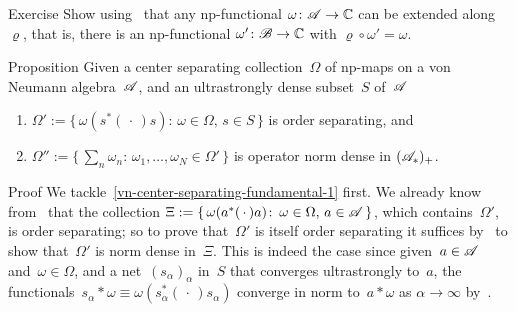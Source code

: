 \documentclass[a]{subfiles}
\begin{document}
\begin{parsec}
\begin{point}{Exercise}
Show 
using~
that any np-functional
$\omega\colon \mathscr{A}\to\mathbb{C}$
can be extended along~$\varrho$,
that is,
there is an np-functional
$\omega'\colon \mathscr{B}\to\mathbb{C}$
with $\varrho\circ \omega' = \omega$.

\end{point}
\begin{point}{Proposition}%
Given a center separating collection~$\Omega$ of np-maps
on a von Neumann algebra~$\mathscr{A}$,
and an ultrastrongly dense subset~$S$ of~$\mathscr{A}$
\begin{enumerate}
\item
	\label{vn-center-separating-fundamental-1}
$\Omega':= \{\,\omega(s^*(\,\cdot\,)s)\colon\,
\omega\in\Omega,\,s\in S\,\}$
is order separating, and
\item
	\label{vn-center-separating-fundamental-2}
$\Omega'':=\{\,\sum_n\omega_n\colon\, \omega_1,\dotsc,\omega_N\in\Omega'\,\}$ is operator norm dense in $(\mathscr{A}_*)_+$.
	\end{enumerate}
\begin{point}{Proof}%
We tackle~\ref{vn-center-separating-fundamental-1}
first. We already know from~
that the collection $\Xi:=\{\, \omega(a^*(\,\cdot\,)a)\colon\, 
\omega\in\Omega,\, a\in\mathscr{A}\,\}$,
which contains~$\Omega'$, is order separating;
so to prove that~$\Omega'$ is itself order separating
it suffices by~ to show that~$\Omega'$
is norm dense in~$\Xi$.
This is indeed the case
since given~$a\in\mathscr{A}$
and~$\omega\in\Omega$,
and a net~$(s_\alpha)_\alpha$ in~$S$
that converges ultrastrongly to~$a$,
the functionals~$s_\alpha \ast\omega
\equiv \omega(s_\alpha^*(\,\cdot\,)s_\alpha)$
converge in norm to~$a\ast \omega$
as $\alpha\to\infty$
by~.


\end{point}
\end{point}
\end{parsec}
\end{document}
